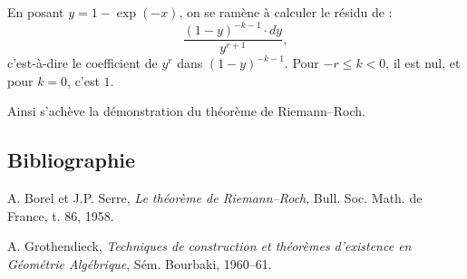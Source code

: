 En
posant \(y=1-\exp(-x)\), on se ramène à calculer le résidu de :
\[
 \frac{(1-y)^{-k-1}\cdot dy}{y^{r+1}},
\]
c'est-à-dire le coefficient de \(y^r\) dans \((1-y)^{-k-1}\). Pour \(-r\leq k<0\), il est nul, et pour \(k=0\), c'est \(1\).

Ainsi s'achève la démonstration du théorème de Riemann--Roch.

\subsection*{Bibliographie}
\begin{enumerate}[label={[\arabic*]}]
\item A. Borel et J.P. Serre, \emph{Le théorème de Riemann--Roch}, Bull. Soc. Math. de France, t. 86, 1958.
\item A. Grothendieck, \emph{Techniques de construction et théorèmes d'existence en Géométrie Algébrique}, Sém. Bourbaki, 1960--61.
\end{enumerate}




